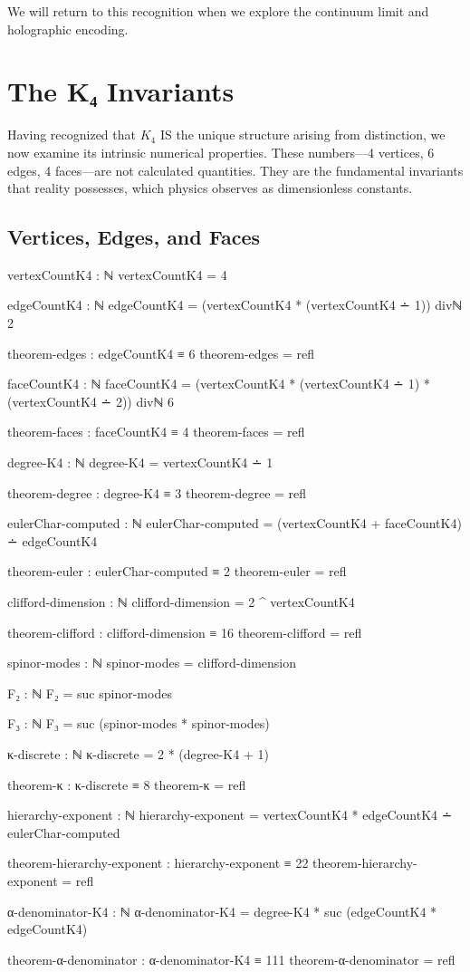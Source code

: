 \documentclass[11pt,a4paper]{book}
\begin{document}
We will return to this recognition when we explore the continuum limit and 
holographic encoding.


\chapter{The K₄ Invariants}
\label{chap:k4-invariants}

Having recognized that $K_4$ IS the unique structure arising from distinction, we now examine its 
intrinsic numerical properties. These numbers—4 vertices, 6 edges, 4 faces—are not calculated quantities. 
They are the fundamental invariants that reality possesses, which physics observes as dimensionless constants.

\section{Vertices, Edges, and Faces}

\begin{code}
vertexCountK4 : ℕ
vertexCountK4 = 4

edgeCountK4 : ℕ
edgeCountK4 = (vertexCountK4 * (vertexCountK4 ∸ 1)) divℕ 2

theorem-edges : edgeCountK4 ≡ 6
theorem-edges = refl

faceCountK4 : ℕ
faceCountK4 = (vertexCountK4 * (vertexCountK4 ∸ 1) * (vertexCountK4 ∸ 2)) divℕ 6

theorem-faces : faceCountK4 ≡ 4
theorem-faces = refl

degree-K4 : ℕ
degree-K4 = vertexCountK4 ∸ 1

theorem-degree : degree-K4 ≡ 3
theorem-degree = refl

eulerChar-computed : ℕ
eulerChar-computed = (vertexCountK4 + faceCountK4) ∸ edgeCountK4

theorem-euler : eulerChar-computed ≡ 2
theorem-euler = refl

clifford-dimension : ℕ
clifford-dimension = 2 ^ vertexCountK4

theorem-clifford : clifford-dimension ≡ 16
theorem-clifford = refl

spinor-modes : ℕ
spinor-modes = clifford-dimension

F₂ : ℕ
F₂ = suc spinor-modes

F₃ : ℕ
F₃ = suc (spinor-modes * spinor-modes)

κ-discrete : ℕ
κ-discrete = 2 * (degree-K4 + 1)

theorem-κ : κ-discrete ≡ 8
theorem-κ = refl

hierarchy-exponent : ℕ
hierarchy-exponent = vertexCountK4 * edgeCountK4 ∸ eulerChar-computed

theorem-hierarchy-exponent : hierarchy-exponent ≡ 22
theorem-hierarchy-exponent = refl

α-denominator-K4 : ℕ
α-denominator-K4 = degree-K4 * suc (edgeCountK4 * edgeCountK4)

theorem-α-denominator : α-denominator-K4 ≡ 111
theorem-α-denominator = refl
\end{code}
\end{document}
